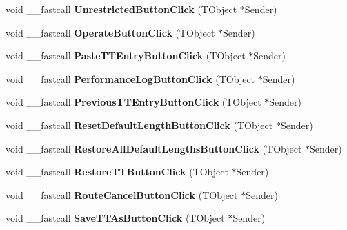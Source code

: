 \begin{DoxyCompactItemize}
void \+\_\+\+\_\+fastcall {\bfseries Unrestricted\+Button\+Click} (T\+Object $\ast$Sender)
\item 
\mbox{\label{class_t_interface_a26619c94a8ad27b574e0963dd123dc2a}} 
void \+\_\+\+\_\+fastcall {\bfseries Operate\+Button\+Click} (T\+Object $\ast$Sender)
\item 
\mbox{\label{class_t_interface_a02c5eb27baa019cb04e4704470371ae9}} 
void \+\_\+\+\_\+fastcall {\bfseries Paste\+T\+T\+Entry\+Button\+Click} (T\+Object $\ast$Sender)
\item 
\mbox{\label{class_t_interface_afd6edff7367e3c8d878d47f24b30e498}} 
void \+\_\+\+\_\+fastcall {\bfseries Performance\+Log\+Button\+Click} (T\+Object $\ast$Sender)
\item 
\mbox{\label{class_t_interface_ac5cc89b457ec23bfceaf09f784b2daa2}} 
void \+\_\+\+\_\+fastcall {\bfseries Previous\+T\+T\+Entry\+Button\+Click} (T\+Object $\ast$Sender)
\item 
\mbox{\label{class_t_interface_aa439e164f7f2304477010985c2caabed}} 
void \+\_\+\+\_\+fastcall {\bfseries Reset\+Default\+Length\+Button\+Click} (T\+Object $\ast$Sender)
\item 
\mbox{\label{class_t_interface_a9113d88b504cd30eb8dd6ecddde1c0ec}} 
void \+\_\+\+\_\+fastcall {\bfseries Restore\+All\+Default\+Lengths\+Button\+Click} (T\+Object $\ast$Sender)
\item 
\mbox{\label{class_t_interface_ae3e591300b5557eb124bad845ea6c34e}} 
void \+\_\+\+\_\+fastcall {\bfseries Restore\+T\+T\+Button\+Click} (T\+Object $\ast$Sender)
\item 
\mbox{\label{class_t_interface_a6296d0831188d08a736eea44d418c381}} 
void \+\_\+\+\_\+fastcall {\bfseries Route\+Cancel\+Button\+Click} (T\+Object $\ast$Sender)
\item 
\mbox{\label{class_t_interface_a5303472f28bc4bb52b74e48d5bbac665}} 
void \+\_\+\+\_\+fastcall {\bfseries Save\+T\+T\+As\+Button\+Click} (T\+Object $\ast$Sender)
\item 

\end{DoxyCompactItemize}
